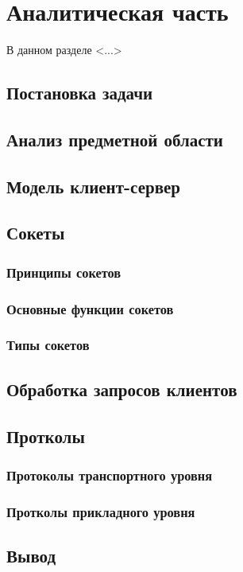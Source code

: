 \chapter{Аналитическая часть}

В данном разделе <...>

\section{Постановка задачи}

\section{Анализ предметной области}

\section{Модель клиент-сервер}

\section{Сокеты}

\subsection{Принципы сокетов}

\subsection{Основные функции сокетов}

\subsection{Типы сокетов}

\section{Обработка запросов клиентов}

\section{Протколы}

\subsection{Протоколы транспортного уровня}

\subsection{Протколы прикладного уровня}


\section*{Вывод}



